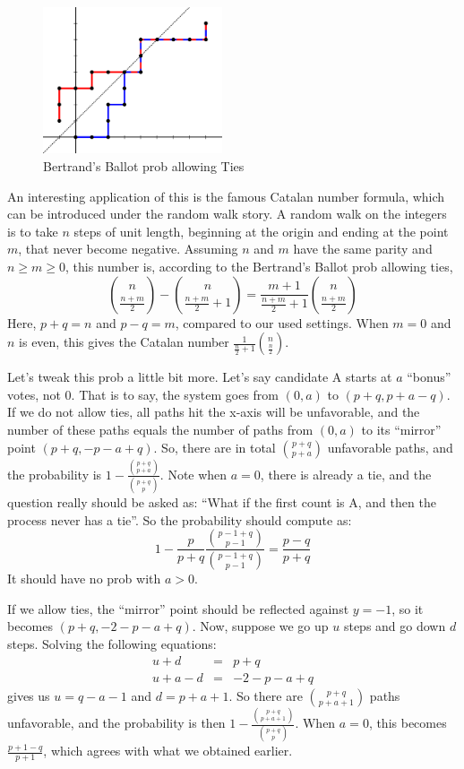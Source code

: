 \begin{figure}[htb]
	\centering	
	\includegraphics[width=150pt]{2000px-AndreReflection.png}
	\caption{Bertrand's Ballot prob allowing Ties}
	\label{fig:Bertrand's_Ballot_prob}
\end{figure}

An interesting application of this is the famous Catalan number formula, which can be introduced under the random walk story. A random walk on the integers is to take $n$ steps of unit length, beginning at the origin and ending at the point $m$, that never become negative. Assuming $n$ and $m$ have the same parity and $n \ge m \ge 0$, this number is, according to the Bertrand's Ballot prob allowing ties,
\begin{equation*}
	{n \choose \frac{n+m}{2}} - {n \choose \frac{n+m}{2}+1} = \frac{m+1}{\frac{n+m}{2}+1} {n \choose \frac{n+m}{2}}
\end{equation*}
Here, $p+q=n$ and $p-q=m$, compared to our used settings. When $m=0$ and $n$ is even, this gives the Catalan number $\frac{1}{\frac{n}{2}+1} {n \choose \frac{n}{2}}$.

Let's tweak this prob a little bit more. Let's say candidate A starts at $a$ ``bonus'' votes, not 0. That is to say, the system goes from $(0,a)$ to $(p+q,p+a-q)$. If we do not allow ties, all paths hit the x-axis will be unfavorable, and the number of these paths equals the number of paths from $(0,a)$ to its ``mirror'' point $(p+q,-p-a+q)$. So, there are in total ${p+q \choose p+a}$ unfavorable paths, and the probability is $1 - \frac{{p+q \choose p+a}}{{p+q \choose p}}$. Note when $a=0$, there is already a tie, and the question really should be asked as: ``What if the first count is A, and then the process never has a tie''. So the probability should compute as:
\begin{equation*}
	1 - \frac{p}{p+q} \frac{{p-1+q \choose p-1}}{{p-1+q \choose p-1}} = \frac{p-q}{p+q}
\end{equation*}
It should have no prob with $a>0$.

If we allow ties, the ``mirror'' point should be reflected against $y=-1$, so it becomes $(p+q,-2-p-a+q)$. Now, suppose we go up $u$ steps and go down $d$ steps. Solving the following equations:
\begin{eqnarray*}
	u+d & = & p+q\\
	u+a-d & = & -2-p-a+q
\end{eqnarray*}
gives us $u=q-a-1$ and $d=p+a+1$. So there are ${p+q \choose p+a+1}$ paths unfavorable, and the probability is then $1-\frac{{p+q \choose p+a+1}}{{p+q \choose p}}$. When $a=0$, this becomes $\frac{p+1-q}{p+1}$, which agrees with what we obtained earlier.

